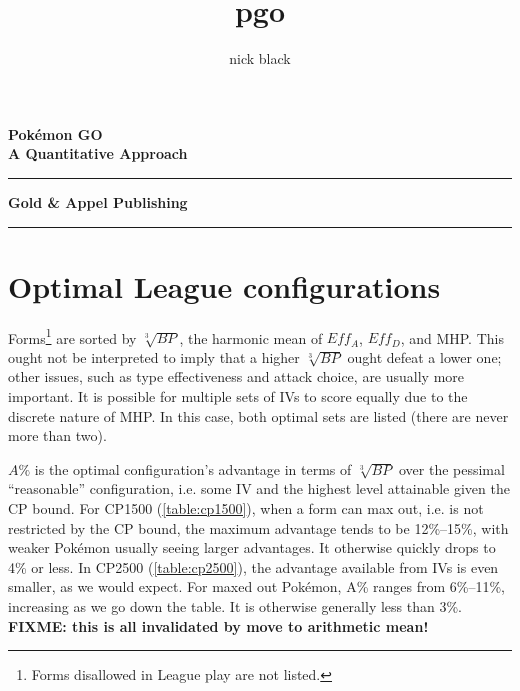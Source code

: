 \documentclass[ebook,10pt,openany,oneside]{memoir}
\title{pgo}
\author{nick black}
\def\LOGO {
  \textbf{
    \Huge Pokémon GO\\
    \Large A Quantitative Approach\\
  }}
\begin{document}
  \pagestyle{empty}
  \begin{center}
  \LOGO
  \vspace{0.5in}
  \end{center}
  \vfill
  \hrule
  \begin{center}
    \textbf{\textsf{Gold \& Appel Publishing}}
  \end{center}
  \hrule
  \clearpage
  \setcounter{page}{1}
  \pagestyle{plain} %

\ifdefined\epub
\else
  \hypertarget{toc}{}%
  \tableofcontents*
  \clearpage
  \hypertarget{lot}{}%
  \listoftables*
  \hypertarget{lof}{}%
  \listoffigures*
  \fi

%
















\appendix
\chapter{Optimal League configurations}
\label{chap:optimal}
Forms\footnote{Forms disallowed in League play are not listed.} are sorted by $\sqrt[3]{BP}$, the harmonic mean of $Eff_A$, $Eff_D$, and MHP\@.
This ought not be interpreted to imply that a higher $\sqrt[3]{BP}$ ought
  defeat a lower one; other issues, such as type effectiveness and attack
  choice, are usually more important.
It is possible for multiple sets of IVs to score equally due to the discrete nature
  of MHP\@.
In this case, both optimal sets are listed (there are never more than two).

$A\%$ is the optimal configuration's advantage in terms of $\sqrt[3]{BP}$
  over the pessimal ``reasonable'' configuration, i.e. some IV
  and the highest level attainable given the CP bound.
For CP1500 (\autoref{table:cp1500}), when a form can max out, i.e. is not restricted by the CP bound,
  the maximum advantage tends to be 12\%--15\%, with weaker Pokémon usually
  seeing larger advantages.
It otherwise quickly drops to 4\% or less.
In CP2500 (\autoref{table:cp2500}), the advantage available from IVs is even smaller, as we would expect.
For maxed out Pokémon, A\% ranges from 6\%--11\%, increasing as we go down the table.
It is otherwise generally less than 3\%.
\textbf{FIXME: this is all invalidated by move to arithmetic mean!}
\end{document}
